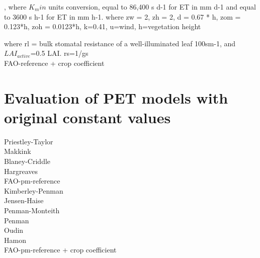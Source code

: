 \documentclass[hydrology,article,submit,moreauthors,pdftex]{Definitions/mdpi}
\begin{document}
, where $K_min$ units conversion, equal to 86,400 s d-1 for ET in mm d-1 and equal to 3600 s h-1 for ET in mm h-1.
where zw = 2, zh = 2, d = 0.67 * h, zom = 0.123*h, zoh = 0.0123*h, k=0.41, u=wind, h=vegetation height

where rl = bulk stomatal resistance of a well-illuminated leaf 100sm-1, and $LAI_{active}$=0.5 LAI. rs=1/gs \\

FAO-reference + crop coefficient

\section{Evaluation of PET models with original constant values}
Priestley-Taylor \\
Makkink \\ 
Blaney-Criddle \\
Hargreaves \\
FAO-pm-reference \\
Kimberley-Penman \\
Jensen-Haise \\
Penman-Monteith \\
Penman \\
Oudin \\
Hamon \\
FAO-pm-reference + crop coefficient \\
\end{document}
